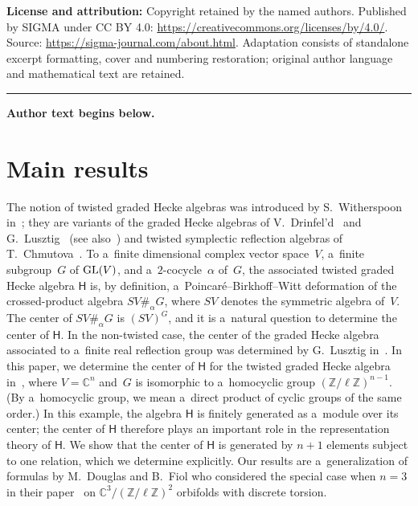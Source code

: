 \documentclass[11pt]{article}
\numberwithin{equation}{section}
\begin{document}
\noindent\textbf{License and attribution:} Copyright retained by the named authors. Published by SIGMA under CC BY 4.0: \url{https://creativecommons.org/licenses/by/4.0/}. Source: \url{https://sigma-journal.com/about.html}. Adaptation consists of standalone excerpt formatting, cover and numbering restoration; original author language and mathematical text are retained.\par
\medskip\hrule\medskip\noindent\textbf{Author text begins below.}\par
\setcounter{section}{0}
\setcounter{subsection}{0}
\setcounter{subsubsection}{0}
\setcounter{Theorem}{0}
\setcounter{equation}{0}
\section{Main results}

The notion of twisted graded Hecke algebras was introduced by S.~Witherspoon in~\cite{W}; they are variants of the
graded Hecke algebras of V.~Drinfel'd~\cite{Dr} and G.~Lusztig~\cite{Lu2} (see also~\cite{RS}) and twisted symplectic
ref\/lection algebras of T.~Chmutova~\cite{Ch}.
To a~f\/inite dimensional complex vector space~$V$, a~f\/inite subgroup~$G$ of ${\rm GL}(V)$, and a~$2$-cocycle~$\alpha$ of~$G$,
the associated twisted graded Hecke algebra $\mathsf{H}$ is, by def\/inition, a~Poincar\'e--Birkhof\/f--Witt deformation of
the crossed-product algebra $SV\#_\alpha G$, where $SV$ denotes the symmetric algebra of~$V$.
The center of $SV\#_\alpha G$ is $(SV)^G$, and it is a~natural question to determine the center of $\mathsf{H}$.
In the non-twisted case, the center of the graded Hecke algebra associated to a~f\/inite real ref\/lection group was
determined by G.~Lusztig in~\cite[Theorem~6.5]{Lu1}.
In this paper, we determine the center of $\mathsf{H}$ for the twisted graded Hecke algebra in~\cite[Example~2.16]{W},
where $V={\mathbb{C}}^n$ and~$G$ is isomorphic to a~homocyclic group $({\mathbb{Z}}/\ell{\mathbb{Z}})^{n-1}$.
(By a~homocyclic group, we mean a~direct product of cyclic groups of the same order.) In this example, the algebra
$\mathsf{H}$ is f\/initely generated as a~module over its center; the center of $\mathsf{H}$ therefore plays an important
role in the representation theory of $\mathsf{H}$.
We show that the center of $\mathsf{H}$ is generated by $n+1$ elements subject to one relation, which we determine
explicitly.
Our results are a~generalization of formulas by M.~Douglas and B.~Fiol who considered the special case when $n=3$ in
their paper~\cite{DF} on ${\mathbb{C}}^3/({\mathbb{Z}}/\ell{\mathbb{Z}})^2$ orbifolds with discrete torsion.
\end{document}
